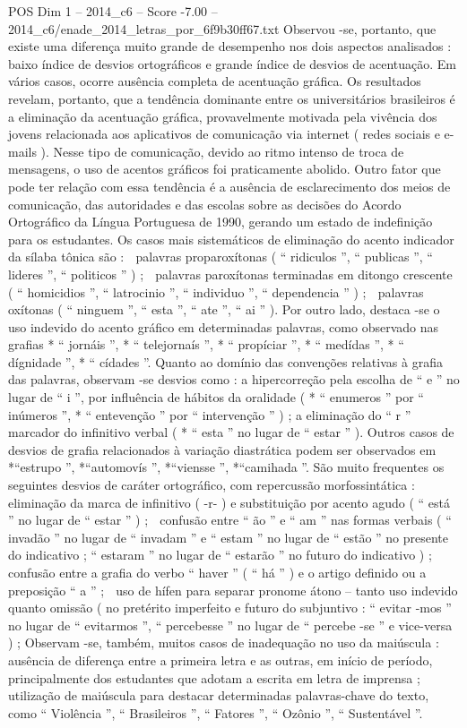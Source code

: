 \begin{textsample}{POS Dim 1 – 2014\_c6 – Score -7.00 – 2014\_c6/enade\_2014\_letras\_por\_6f9b30ff67.txt}
Observou -se, portanto, que existe uma diferença muito grande de desempenho nos dois aspectos analisados : baixo índice de desvios ortográficos e grande índice de desvios de acentuação.
Em vários casos, ocorre ausência completa de acentuação gráfica.
Os resultados revelam, portanto, que a tendência dominante entre os universitários brasileiros é a eliminação da acentuação gráfica, provavelmente motivada pela vivência dos jovens relacionada aos aplicativos de comunicação via internet ( redes sociais e e-mails ).
Nesse tipo de comunicação, devido ao ritmo intenso de troca de mensagens, o uso de acentos gráficos foi praticamente abolido.
Outro fator que pode ter relação com essa tendência é a ausência de esclarecimento dos meios de comunicação, das autoridades e das escolas sobre as decisões do Acordo Ortográfico da Língua Portuguesa de 1990, gerando um estado de indefinição para os estudantes.
Os casos mais sistemáticos de eliminação do acento indicador da sílaba tônica são :  palavras proparoxítonas ( “ ridiculos ”, “ publicas ”, “ lideres ”, “ politicos ” ) ;  palavras paroxítonas terminadas em ditongo crescente ( “ homicidios ”, “ latrocinio ”, “ individuo ”, “ dependencia ” ) ;  palavras oxítonas ( “ ninguem ”, “ esta ”, “ ate ”, “ ai ” ).
Por outro lado, destaca -se o uso indevido do acento gráfico em determinadas palavras, como observado nas grafias * “ jornáis ”, * “ telejornaís ”, * “ propíciar ”, * “ medídas ”, * “ dígnidade ”, * “ cídades ”.
Quanto ao domínio das convenções relativas à grafia das palavras, observam -se desvios como : a hipercorreção pela escolha de “ e ” no lugar de “ i ”, por influência de hábitos da oralidade ( * “ enumeros ” por “ inúmeros ”, * “ entevenção ” por “ intervenção ” ) ; a eliminação do “ r ” marcador do infinitivo verbal ( * “ esta ” no lugar de “ estar ” ).
Outros casos de desvios de grafia relacionados à variação diastrática podem ser observados em *“estrupo ”, *“automovís ”, *“viensse ”, *“camihada ”.
São muito frequentes os seguintes desvios de caráter ortográfico, com repercussão morfossintática :  eliminação da marca de infinitivo ( -r- ) e substituição por acento agudo ( “ está ” no lugar de “ estar ” ) ;  confusão entre “ ão ” e “ am ” nas formas verbais ( “ invadão ” no lugar de “ invadam ” e “ estam ” no lugar de “ estão ” no presente do indicativo ; “ estaram ” no lugar de “ estarão ” no futuro do indicativo ) ;  confusão entre a grafia do verbo “ haver ” ( “ há ” ) e o artigo definido ou a preposição “ a ” ;  uso de hífen para separar pronome átono – tanto uso indevido quanto omissão ( no pretérito imperfeito e futuro do subjuntivo : “ evitar -mos ” no lugar de “ evitarmos ”, “ percebesse ” no lugar de “ percebe -se ” e vice-versa ) ; Observam -se, também, muitos casos de inadequação no uso da maiúscula : ausência de diferença entre a primeira letra e as outras, em início de período, principalmente dos estudantes que adotam a escrita em letra de imprensa ; utilização de maiúscula para destacar determinadas palavras-chave do texto, como “ Violência ”, “ Brasileiros ”, “ Fatores ”, “ Ozônio ”, “ Sustentável ”.

\end{textsample}
